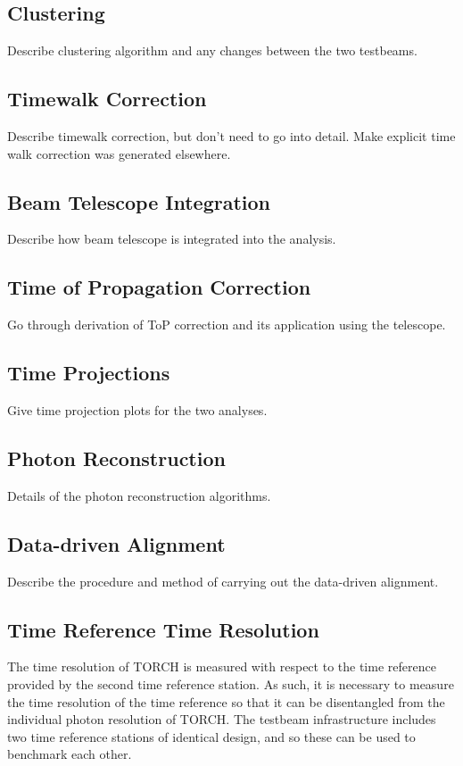 \subsection{Clustering}
Describe clustering algorithm and any changes between the two testbeams.

\subsection{Timewalk Correction}
Describe timewalk correction, but don't need to go into detail. Make explicit time walk correction was generated elsewhere.

\subsection{Beam Telescope Integration}
Describe how beam telescope is integrated into the analysis.

\subsection{Time of Propagation Correction}
Go through derivation of ToP correction and its application using the telescope.

\subsection{Time Projections}
Give time projection plots for the two analyses.

\subsection{Photon Reconstruction}
Details of the photon reconstruction algorithms.

\subsection{Data-driven Alignment}
Describe the procedure and method of carrying out the data-driven alignment.

\subsection{Time Reference Time Resolution}
The time resolution of TORCH is measured with respect to the time reference provided by the second time reference station. As such, it is necessary to measure the time resolution of the time reference so that it can be disentangled from the individual photon resolution of TORCH. The testbeam infrastructure includes two time reference stations of identical design, and so these can be used to benchmark each other.

